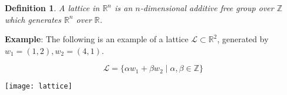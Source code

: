 \documentclass[12pt]{article}
\newtheorem*{defn}{Definition}
\newcommand{\Ints}{\mathbb{Z}}
\newcommand{\Reals}{\mathbb{R}}
\begin{document}
\begin{defn}
A lattice in ${\Reals}^n$ is an $n$-dimensional additive free group over $\Ints$ which generates ${\Reals}^n$ over $\Reals$.
\end{defn}

{\bf Example}: The following is an example of a lattice $\mathcal{L}\subset {\Reals}^2$, generated by $w_1=(1,2),w_2=(4,1)$.

$$\mathcal{L}=\{ \alpha w_1 +\beta w_2 \mid \alpha,\beta \in \Ints \} $$
\quad
\begin{center}
\texttt{[image: lattice]}
\end{center}
\end{document}
